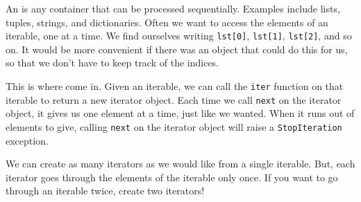 An  is any container that can be processed sequentially.
Examples include lists, tuples, strings, and dictionaries.
Often we want to access the elements of an iterable, one at a time.
We find ourselves writing \lstinline$lst[0]$, \lstinline$lst[1]$,
\lstinline$lst[2]$, and so on.
It would be more convenient if there was an object that could do this for us,
so that we don't have to keep track of the indices.

This is where  come in. Given an iterable, we can call the
\lstinline$iter$ function on that iterable to return a new iterator object.
Each time we call \lstinline$next$ on the iterator object, it gives us one
element at a time, just like we wanted.
When it runs out of elements to give, calling \lstinline$next$ on the iterator
object will raise a \lstinline$StopIteration$ exception.

We can create as many iterators as we would like from a single iterable.
But, each iterator goes through the elements of the iterable only once.
If you want to go through an iterable twice, create two iterators!
